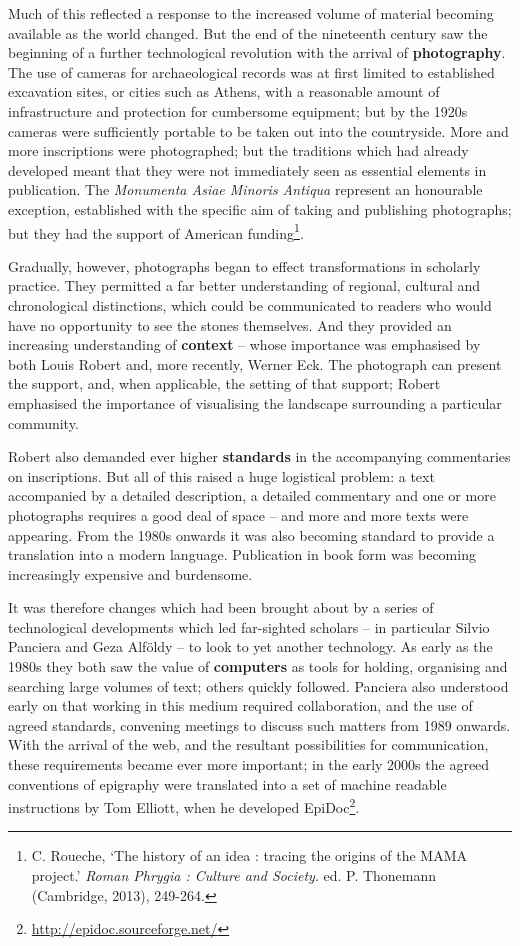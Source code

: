 \documentclass[amsthm,ebook]{saparticle}
\begin{document}
Much of this reflected a response to the increased volume of material becoming 
available as the world changed. But the end of the nineteenth century saw the beginning 
of a further technological revolution with the arrival of \textbf{photography}. 
The use of cameras for archaeological records was at first limited to established 
excavation sites, or cities such as Athens, with a reasonable amount of infrastructure 
and protection for cumbersome equipment; but by the 1920s cameras were sufficiently 
portable to be taken out into the countryside. More and more inscriptions were 
photographed; but the traditions which had already developed meant that they were 
not immediately seen as essential elements in publication. The \textit{Monumenta 
Asiae Minoris Antiqua} represent an honourable exception, established with the 
specific aim of taking and publishing photographs; but they had the support of 
American funding\footnote{C. Roueche, `The history of an idea : tracing the origins of the MAMA project.' \emph{Roman Phrygia : Culture and Society}. ed. P. Thonemann (Cambridge, 2013),  249-264.}.  

Gradually, however, photographs began to effect transformations in scholarly practice. 
They permitted a far better understanding of regional, cultural and chronological 
distinctions, which could be communicated to readers who would have no opportunity 
to see the stones themselves. And they provided an increasing understanding of 
\textbf{context} – whose importance was emphasised by both Louis Robert and, 
more recently, Werner Eck. The photograph can present the support, and, when applicable, 
the setting of that support; Robert emphasised the importance of visualising the 
landscape surrounding a particular community.

Robert also demanded ever higher \textbf{standards} in the accompanying commentaries 
on inscriptions. But all of this raised a huge logistical problem: a text accompanied 
by a detailed description, a detailed commentary and one or more photographs requires 
a good deal of space – and more and more texts were appearing. From the 1980s 
onwards it was also becoming standard to provide a translation into a modern language. 
Publication in book form was becoming increasingly expensive and burdensome.

It was therefore changes which had been brought about by a series of technological 
developments which led far-sighted scholars – in particular Silvio Panciera  
and Geza Alföldy – to look to yet another technology. As early as the 1980s 
they both saw the value of \textbf{computers} as tools for holding, organising 
and searching large volumes of text; others quickly followed. Panciera also understood 
early on that working in this medium required collaboration, and the use of agreed 
standards, convening meetings to discuss such matters from 1989 onwards.  With 
the arrival of the web, and the resultant possibilities for communication, these 
requirements became ever more important; in the early 2000s the agreed conventions 
of epigraphy were translated into a set of machine readable instructions by Tom 
Elliott, when he developed EpiDoc\footnote{\url{http://epidoc.sourceforge.net/}}. 
\end{document}
